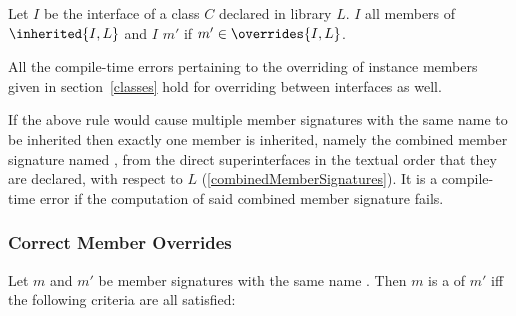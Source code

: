 \documentclass[makeidx]{article}
\begin{document}
\LMHash{}%
Let $I$ be the interface of a class $C$ declared in library $L$.
$I$  all members of $\inherited{I, L}$
and $I$  $m'$ if $m' \in \overrides{I, L}$.

\LMHash{}%
All the compile-time errors pertaining to the overriding of instance members
given in section~\ref{classes} hold for overriding between interfaces as well.

\LMHash{}%
If the above rule would cause multiple member signatures
with the same name \id{} to be inherited then
exactly one member is inherited, namely
the combined member signature named \id{},
from the direct superinterfaces
in the textual order that they are declared,
with respect to $L$
(\ref{combinedMemberSignatures}).
It is a compile-time error
if the computation of said combined member signature fails.


\subsubsection{Correct Member Overrides}

\LMHash{}%
Let $m$ and $m'$ be member signatures with the same name \id.
Then $m$ is a  of $m'$
if{}f the following criteria are all satisfied:
\end{document}
